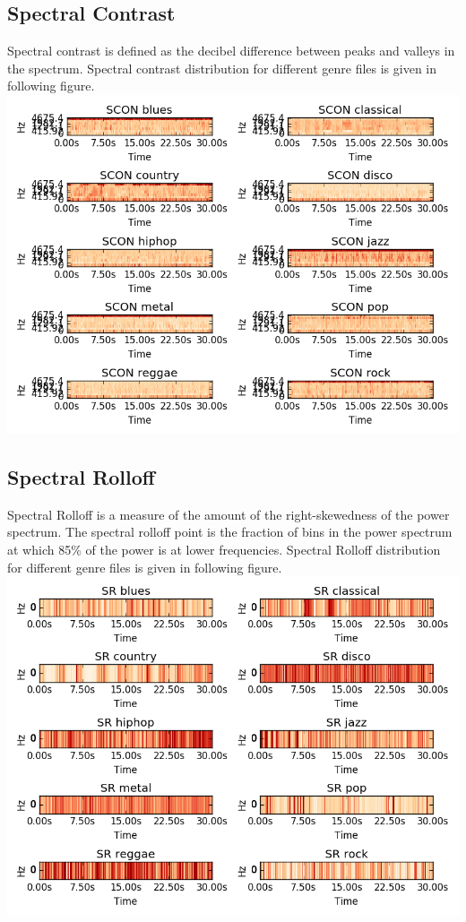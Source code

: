 \documentclass[conference]{IEEEtran}
\begin{document}
\subsection{Spectral Contrast}
Spectral contrast is defined as the decibel difference between peaks and valleys in the spectrum\cite{contrast}.
Spectral contrast distribution for different genre files is given in following figure.\\
\includegraphics[width=\columnwidth]{SCON_fig}
\subsection{Spectral Rolloff}
Spectral Rolloff is a measure of the amount of the right-skewedness of the power spectrum. The spectral rolloff point is the fraction of bins in the power spectrum at which 85\% of the power is at lower frequencies\cite{jaudio}.
Spectral Rolloff distribution for different genre files is given in following figure.\\
\includegraphics[width=\columnwidth]{SR_fig}
\end{document}
